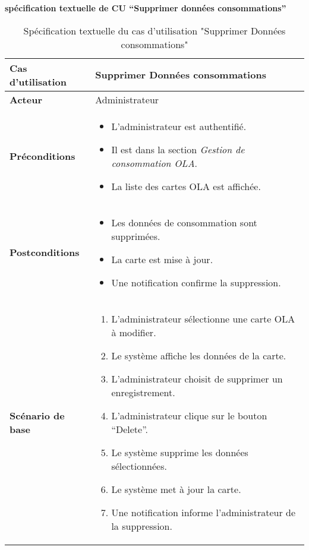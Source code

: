 \documentclass[a4paper,11pt]{report}
\begin{document}
\newpage
\textbf{spécification textuelle de CU “Supprimer données consommations”
}

\begin{table}[H]
  \centering
  \renewcommand{\arraystretch}{1.5}
  \caption{Spécification textuelle du cas d'utilisation "Supprimer Données consommations"}
  \begin{tabularx}{\textwidth}{|l|X|}
    \hline
    \textbf{Cas d'utilisation} & Supprimer Données consommations \\ \hline
    \textbf{Acteur} & Administrateur \\ \hline
    \textbf{Préconditions} & 
    \begin{itemize}
      \item L’administrateur est authentifié.
      \item Il est dans la section \textit{Gestion de consommation OLA}.
      \item La liste des cartes OLA est affichée.
    \end{itemize} \\ \hline
    \textbf{Postconditions} & 
    \begin{itemize}
      \item Les données de consommation sont supprimées.
      \item La carte est mise à jour.
      \item Une notification confirme la suppression.
    \end{itemize} \\ \hline
    \textbf{Scénario de base} & 
    \begin{enumerate}
      \item L’administrateur sélectionne une carte OLA à modifier.
      \item Le système affiche les données de la carte.
      \item L’administrateur choisit de supprimer un enregistrement.
      \item L’administrateur clique sur le bouton “Delete”.
      \item Le système supprime les données sélectionnées.
      \item Le système met à jour la carte.
      \item Une notification informe l’administrateur de la suppression.
    \end{enumerate} \\ \hline
  \end{tabularx}
\end{table}
\end{document}
